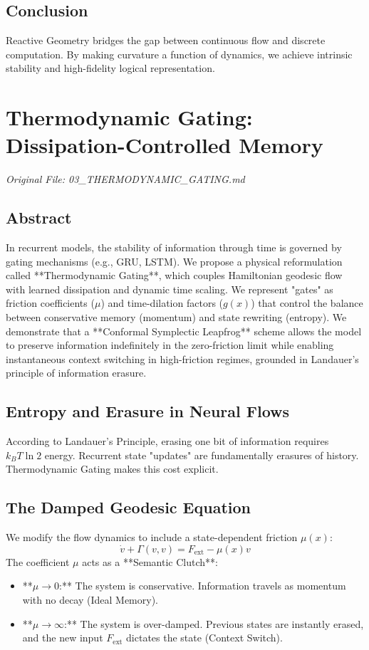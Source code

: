 \documentclass[11pt,a4paper]{report}
\begin{document}
\section{Conclusion}
Reactive Geometry bridges the gap between continuous flow and discrete computation. By making curvature a function of dynamics, we achieve intrinsic stability and high-fidelity logical representation.

\chapter{Thermodynamic Gating: Dissipation-Controlled Memory}
\textit{Original File: 03\_THERMODYNAMIC\_GATING.md}

\section{Abstract}
In recurrent models, the stability of information through time is governed by gating mechanisms (e.g., GRU, LSTM). We propose a physical reformulation called **Thermodynamic Gating**, which couples Hamiltonian geodesic flow with learned dissipation and dynamic time scaling. We represent "gates" as friction coefficients ($\mu$) and time-dilation factors ($g(x)$) that control the balance between conservative memory (momentum) and state rewriting (entropy). We demonstrate that a **Conformal Symplectic Leapfrog** scheme allows the model to preserve information indefinitely in the zero-friction limit while enabling instantaneous context switching in high-friction regimes, grounded in Landauer's principle of information erasure.

\section{Entropy and Erasure in Neural Flows}
According to Landauer's Principle, erasing one bit of information requires $k_BT \ln 2$ energy. Recurrent state "updates" are fundamentally erasures of history. Thermodynamic Gating makes this cost explicit.

\section{The Damped Geodesic Equation}
We modify the flow dynamics to include a state-dependent friction $\mu(x)$:
\begin{equation}
    \dot{v} + \Gamma(v, v) = F_{\text{ext}} - \mu(x) v
\end{equation}
The coefficient $\mu$ acts as a **Semantic Clutch**:
\begin{itemize}
    \item **$\mu \to 0$:** The system is conservative. Information travels as momentum with no decay (Ideal Memory).
    \item **$\mu \to \infty$:** The system is over-damped. Previous states are instantly erased, and the new input $F_{\text{ext}}$ dictates the state (Context Switch).
\end{itemize}
\end{document}
